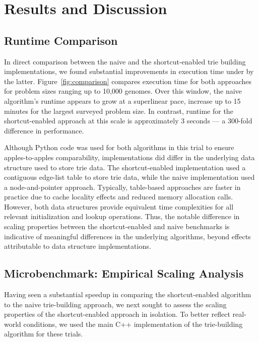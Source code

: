 \section{Results and Discussion} \label{sec:results}

\subsection{Runtime Comparison}

In direct comparison between the naive and the shortcut-enabled trie building implementations, we found substantial improvements in execution time under by the latter.
Figure~\ref{fig:comparison} compares execution time for both approaches for problem sizes ranging up to 10,000 genomes.
Over this window, the naive algorithm's runtime appears to grow at a superlinear pace, increase up to 15 minutes for the largest surveyed problem size.
In contrast, runtime for the shortcut-enabled approach at this scale is approximately 3 seconds --- a 300-fold difference in performance.



Although Python code was used for both algorithms in this trial to ensure apples-to-apples comparability, implementations did differ in the underlying data structure used to store trie data.
The shortcut-enabled implementation used a contiguous edge-list table to store trie data, while the naive implementation used a node-and-pointer approach.
Typically, table-based approaches are faster in practice due to cache locality effects and reduced memory allocation calls.
However, both data structures provide equivalent time complexities for all relevant initialization and lookup operations.
Thus, the notable difference in scaling properties between the shortcut-enabled and naive benchmarks is indicative of meaningful differences in the underlying algorithms, beyond effects attributable to data structure implementations.

\subsection{Microbenchmark: Empirical Scaling Analysis}



Having seen a substantial speedup in comparing the shortcut-enabled algorithm to the naive trie-building approach, we next sought to assess the scaling properties of the shortcut-enabled approach in isolation.
To better reflect real-world conditions, we used the main C++ implementation of the trie-building algorithm for these trials.

